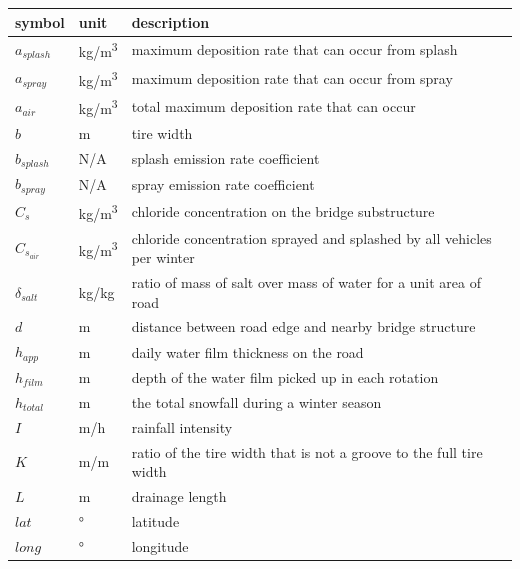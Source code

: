 \documentclass[12pt]{article}
\begin{document}
\renewcommand{\arraystretch}{1.2}
\noindent \begin{longtable*}{l l p{12cm}} \toprule
\textbf{symbol} & \textbf{unit} & \textbf{description}\\
\midrule 
$a_{splash}$ & \si{kg/m^3} & maximum deposition rate that can occur from splash\\
$a_{spray}$ & \si{kg/m^3} & maximum deposition rate that can occur from spray\\
$a_{air}$ & \si{kg/m^3} & total maximum deposition rate that can occur\\
$b$ & \si{m} & tire width\\
$b_{splash}$ & N/A & splash emission rate coefficient\\
$b_{spray}$ & N/A & spray emission rate coefficient\\
$C_s$ & \si{kg/m^3} & chloride concentration on the bridge substructure\\
$C_{s_{air}}$ & \si{kg/m^3} & chloride concentration sprayed and splashed by all vehicles per winter\\
$\delta_{salt}$ & kg/kg & ratio of mass of salt over mass of water for a unit area of road\\
$d$ & \si{m} & distance between road edge and nearby bridge structure\\
$h_{app}$ & \si{m} & daily water film thickness on the road\\
$h_{film}$ & \si{m} & depth of the water film picked up in each rotation\\
$h_{total}$ & \si{m} & the total snowfall during a winter season\\
$I$ & \si{m/h} & rainfall intensity\\
$K$ & m/m & ratio of the tire width that is not a groove to the full tire width\\
$L$ & \si{m} & drainage length\\
$lat$ & \si{\degree} & latitude\\
$long$ & \si{\degree} & longitude\\


\end{longtable*}
\end{document}
